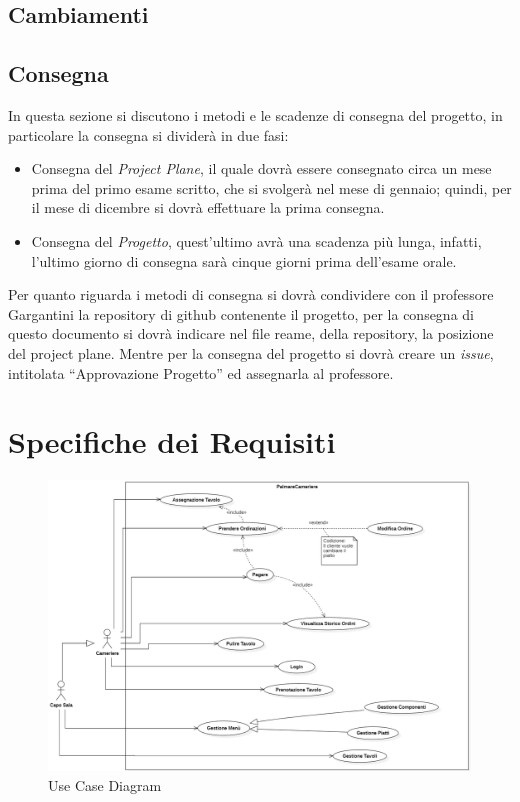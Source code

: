 \documentclass{book}
\begin{document}
\section{Cambiamenti}


\section{Consegna}


In questa sezione si discutono i metodi e le scadenze di consegna del progetto, in particolare la consegna si dividerà in due fasi:


\begin{itemize}
    \item Consegna del \textit{Project Plane}, il quale dovrà essere consegnato circa un mese prima del primo esame scritto, che si svolgerà nel mese di gennaio; quindi, per il mese di dicembre si dovrà effettuare la prima consegna.
    \item Consegna del \textit{Progetto}, quest'ultimo avrà una scadenza più lunga, infatti, l'ultimo giorno di consegna sarà cinque giorni prima dell'esame orale.
\end{itemize}
Per quanto riguarda i metodi di consegna si dovrà condividere con il professore Gargantini la repository di github contenente il progetto, per la consegna di questo documento si dovrà indicare nel file reame, della repository, la posizione del project plane. Mentre per la consegna del progetto si dovrà creare un \textit{issue}, intitolata “Approvazione Progetto” ed assegnarla al professore.

\chapter{Specifiche dei Requisiti}

\begin{figure}[ht]
    \centering
    \includegraphics[width=1\linewidth]{../../UML/Diagrammi/Use_Case_Diagram.png}
    \caption{Use Case Diagram}
    \label{fig: use_case_diagram}
\end{figure}
\end{document}

